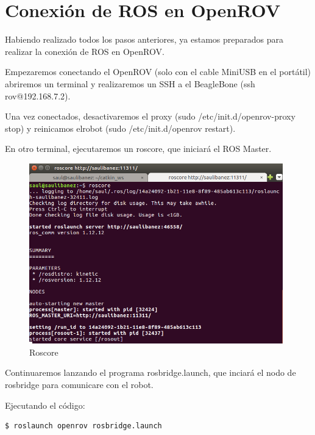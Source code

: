 \section{Conexión de ROS en OpenROV}
\label{cap:Conexion de ROS en OpenROV}

Habiendo realizado todos los pasos anteriores, ya estamos preparados para realizar la conexión de ROS en OpenROV.

Empezaremos conectando el OpenROV (solo con el cable MiniUSB en el portátil) abriremos un terminal y realizaremos un SSH a el BeagleBone (ssh rov@192.168.7.2).

Una vez conectados, desactivaremos el proxy (sudo /etc/init.d/openrov-proxy stop) y reinicamos elrobot (sudo /etc/init.d/openrov restart).

En otro terminal, ejecutaremos un roscore, que iniciará el ROS Master.

\begin{figure} [hbtp]
  \begin{center}
    \includegraphics[width=11cm]{img/cap4/roscore}
  \end{center}
  \caption{Roscore}
  \label{fig:roscore}
\end{figure}
\newpage

Continuaremos lanzando el programa rosbridge.launch, que inciará el nodo de rosbridge para comunicare con el robot.

Ejecutando el código:
\begin{lstlisting}[caption=launch, label={lst:launch}]
	$ roslaunch openrov rosbridge.launch
\end{lstlisting}

